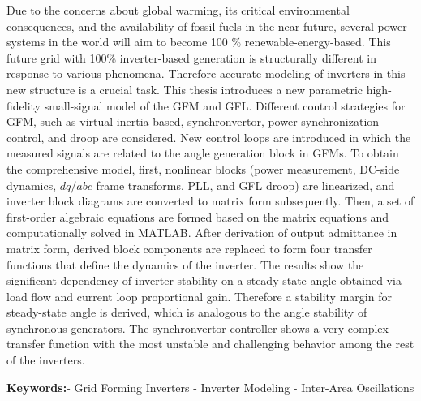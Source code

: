 
\begin{summary}

Due to the concerns about global warming, its critical environmental consequences, and the availability of fossil fuels in the near future, several power systems in the world will aim to become 100 \% renewable-energy-based. This future grid with 100\% inverter-based generation is structurally different in response to various phenomena. Therefore accurate modeling of inverters in this new structure is a crucial task. This thesis introduces a new parametric high-fidelity small-signal model of the \gls{GFM} and \gls{GFL}. Different control strategies for GFM, such as virtual-inertia-based, synchronvertor, power synchronization control, and droop are considered. New control loops are introduced in which the measured signals are related to the angle generation block in \gls{GFM}s. To obtain the comprehensive model, first, nonlinear blocks (power measurement, DC-side dynamics, $dq/abc$ frame transforms, \gls{PLL}, and GFL droop) are linearized, and inverter block diagrams are converted to matrix form subsequently. Then, a set of first-order algebraic equations are formed based on the matrix equations and computationally solved in MATLAB. After derivation of output admittance in matrix form, derived block components are replaced to form four transfer functions that define the dynamics of the inverter. The results show the significant dependency of inverter stability on a steady-state angle obtained via load flow and current loop proportional gain. Therefore a stability margin for steady-state angle is derived, which is analogous to the angle stability of synchronous generators. The synchronvertor controller shows a very complex transfer function with the most unstable and challenging behavior among the rest of the inverters.


\textbf{Keywords:}- Grid Forming Inverters - Inverter Modeling - Inter-Area Oscillations

\end{summary}
